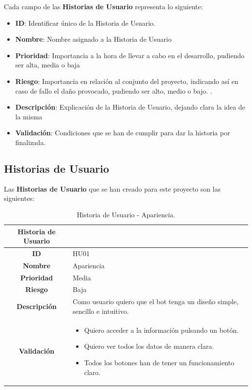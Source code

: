 Cada campo de las \textbf{Historias de Usuario} representa lo siguiente:

\begin{itemize}
	\item \textbf{ID}: Identificar único de la Historia de Usuario.
	\item \textbf{Nombre}: Nombre asignado a la Historia de Usuario
	\item \textbf{Prioridad}: Importancia a la hora de llevar a cabo en el desarrollo, pudiendo ser alta, media o baja
	\item \textbf{Riesgo}: Importancia en relación al conjunto del proyecto, indicando así en caso de fallo el daño provocado, pudiendo ser alto, medio o bajo. .
	\item \textbf{Descripción}: Explicación de la Historia de Usuario, dejando clara la idea de la misma
	\item \textbf{Validación}: Condiciones que se han de cumplir para dar la historia por finalizada.
\end{itemize}

\subsection{Historias de Usuario}

Las \textbf{Historias de Usuario} que se han creado para este proyecto son las siguientes:

\begin{table}[H]
	\begin{center}
		\begin{tabular}{| c | p{9cm} |}
			\hline
			
			Historia de Usuario &  \\ \hline
			
			
			\textbf{ID} & HU01 \\
			\textbf{Nombre} & Apariencia \\
			\textbf{Prioridad} & Media \\
			\textbf{Riesgo} & Baja \\
			\textbf{Descripción} & Como usuario quiero que el bot tenga un diseño simple, sencillo e intuitivo. \\
			\textbf{Validación} & \begin{itemize}
				\item Quiero acceder a la información pulsando un botón.
				\item Quiero ver todos los datos de manera clara.
				\item Todos los botones han de tener un funcionamiento claro.
			\end{itemize} \\ \hline
		\end{tabular}
		\caption{Historia de Usuario - Apariencia.}
	\end{center}
\end{table}

